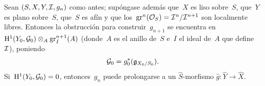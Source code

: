 \begin{corollaire}
\label{III.5.6}
Sean $(S,X,Y,\cal{I},g_n)$ como antes; supóngase además que~$X$ es liso sobre~$S$, que~$Y$ es plano sobre~$S$, que~$S$ es afín y que los~$\gr^n(\cal{O}_S)=\cal{I}^n/\cal{I}^{n+1}$ son localmente libres. Entonces la obstrucción para construir~$g_{n+1}$ se encuentra en~$\H^1(Y_0,\cal{G}_0)\otimes_A\gr_I^{n+1}(A)$ (donde~$A$ es el anillo de~$S$ e~$I$ el ideal de~$A$ que define~$\cal{I}$), poniendo
\begin{equation*}
\cal{G}_0=g_0^*(\goth{g}_{X_0/S_0}).
\end{equation*}
Si~$\H^1(Y_0,\cal{G}_0)=0$, entonces~$g_n$ puede prolongarse a un $\widehat{S}$-morfismo $\widehat{g}\colon\widehat{Y}\to\widehat{X}$.
\end{corollaire}
